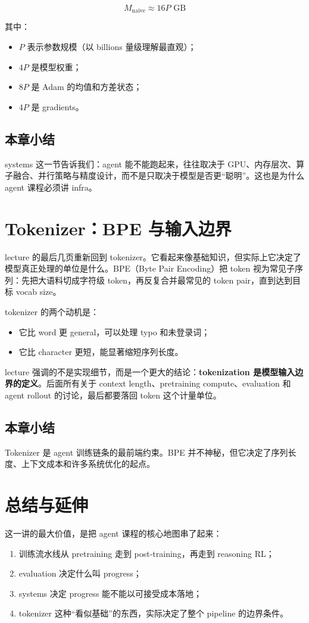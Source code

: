\documentclass[a4paper]{article}
\begin{document}
\[
M_{\text{naive}} \approx 16P \text{ GB}
\]

其中：
\begin{itemize}
    \item \(P\) 表示参数规模（以 billions 量级理解最直观）；
    \item \(4P\) 是模型权重；
    \item \(8P\) 是 Adam 的均值和方差状态；
    \item \(4P\) 是 gradients。
\end{itemize}

\subsection{本章小结}
systems 这一节告诉我们：agent 能不能跑起来，往往取决于 GPU、内存层次、算子融合、并行策略与精度设计，而不是只取决于模型是否更“聪明”。这也是为什么 agent 课程必须讲 infra。

\section{Tokenizer：BPE 与输入边界}
lecture 的最后几页重新回到 tokenizer。它看起来像基础知识，但实际上它决定了模型真正处理的单位是什么。BPE（Byte Pair Encoding）把 token 视为常见子序列：先把大语料切成字符级 token，再反复合并最常见的 token pair，直到达到目标 vocab size。

tokenizer 的两个动机是：
\begin{itemize}
    \item 它比 word 更 general，可以处理 typo 和未登录词；
    \item 它比 character 更短，能显著缩短序列长度。
\end{itemize}

lecture 强调的不是实现细节，而是一个更大的结论：\textbf{tokenization 是模型输入边界的定义}。后面所有关于 context length、pretraining compute、evaluation 和 agent rollout 的讨论，最后都要落回 token 这个计量单位。

\subsection{本章小结}
Tokenizer 是 agent 训练链条的最前端约束。BPE 并不神秘，但它决定了序列长度、上下文成本和许多系统优化的起点。

\section{总结与延伸}
这一讲的最大价值，是把 agent 课程的核心地图串了起来：
\begin{enumerate}
    \item 训练流水线从 pretraining 走到 post-training，再走到 reasoning RL；
    \item evaluation 决定什么叫 progress；
    \item systems 决定 progress 能不能以可接受成本落地；
    \item tokenizer 这种“看似基础”的东西，实际决定了整个 pipeline 的边界条件。
\end{enumerate}
\end{document}
